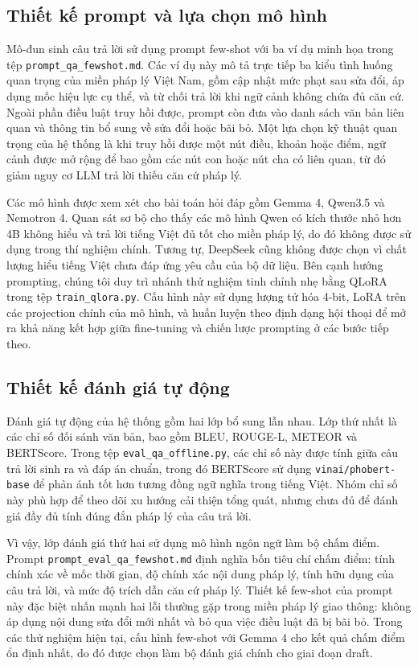 \subsection{Thiết kế prompt và lựa chọn mô hình}
Mô-đun sinh câu trả lời sử dụng prompt few-shot với ba ví dụ minh họa trong tệp \texttt{prompt\_qa\_fewshot.md}. Các ví dụ này mô tả trực tiếp ba kiểu tình huống quan trọng của miền pháp lý Việt Nam, gồm cập nhật mức phạt sau sửa đổi, áp dụng mốc hiệu lực cụ thể, và từ chối trả lời khi ngữ cảnh không chứa đủ căn cứ. Ngoài phần điều luật truy hồi được, prompt còn đưa vào danh sách văn bản liên quan và thông tin bổ sung về sửa đổi hoặc bãi bỏ. Một lựa chọn kỹ thuật quan trọng của hệ thống là khi truy hồi được một nút điều, khoản hoặc điểm, ngữ cảnh được mở rộng để bao gồm các nút con hoặc nút cha có liên quan, từ đó giảm nguy cơ LLM trả lời thiếu căn cứ pháp lý.

Các mô hình được xem xét cho bài toán hỏi đáp gồm Gemma 4, Qwen3.5 và Nemotron 4. Quan sát sơ bộ cho thấy các mô hình Qwen có kích thước nhỏ hơn 4B không hiểu và trả lời tiếng Việt đủ tốt cho miền pháp lý, do đó không được sử dụng trong thí nghiệm chính. Tương tự, DeepSeek cũng không được chọn vì chất lượng hiểu tiếng Việt chưa đáp ứng yêu cầu của bộ dữ liệu. Bên cạnh hướng prompting, chúng tôi duy trì nhánh thử nghiệm tinh chỉnh nhẹ bằng QLoRA trong tệp \texttt{train\_qlora.py}. Cấu hình này sử dụng lượng tử hóa 4-bit, LoRA trên các projection chính của mô hình, và huấn luyện theo định dạng hội thoại để mở ra khả năng kết hợp giữa fine-tuning và chiến lược prompting ở các bước tiếp theo.

\subsection{Thiết kế đánh giá tự động}
Đánh giá tự động của hệ thống gồm hai lớp bổ sung lẫn nhau. Lớp thứ nhất là các chỉ số đối sánh văn bản, bao gồm BLEU, ROUGE-L, METEOR và BERTScore. Trong tệp \texttt{eval\_qa\_offline.py}, các chỉ số này được tính giữa câu trả lời sinh ra và đáp án chuẩn, trong đó BERTScore sử dụng \texttt{vinai/phobert-base} để phản ánh tốt hơn tương đồng ngữ nghĩa trong tiếng Việt. Nhóm chỉ số này phù hợp để theo dõi xu hướng cải thiện tổng quát, nhưng chưa đủ để đánh giá đầy đủ tính đúng đắn pháp lý của câu trả lời.

Vì vậy, lớp đánh giá thứ hai sử dụng mô hình ngôn ngữ làm bộ chấm điểm. Prompt \texttt{prompt\_eval\_qa\_fewshot.md} định nghĩa bốn tiêu chí chấm điểm: tính chính xác về mốc thời gian, độ chính xác nội dung pháp lý, tính hữu dụng của câu trả lời, và mức độ trích dẫn căn cứ pháp lý. Thiết kế few-shot của prompt này đặc biệt nhấn mạnh hai lỗi thường gặp trong miền pháp lý giao thông: không áp dụng nội dung sửa đổi mới nhất và bỏ qua việc điều luật đã bị bãi bỏ. Trong các thử nghiệm hiện tại, cấu hình few-shot với Gemma 4 cho kết quả chấm điểm ổn định nhất, do đó được chọn làm bộ đánh giá chính cho giai đoạn draft.


